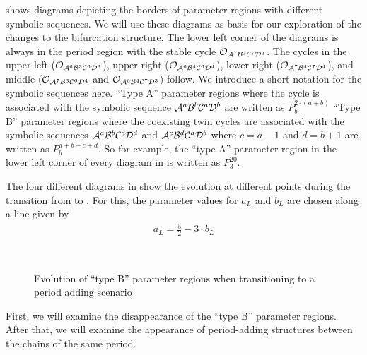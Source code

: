  shows diagrams depicting the borders of parameter regions with different symbolic sequences.
We will use these diagrams as basis for our exploration of the changes to the bifurcation structure.
The lower left corner of the diagrams is always in the period region with the stable cycle $\mathcal{O}_{\mathcal{A}^7\mathcal{B}^3\mathcal{C}^7\mathcal{D}^3}$.
The cycles in the upper left ($\mathcal{O}_{\mathcal{A}^6\mathcal{B}^3\mathcal{C}^6\mathcal{D}^3}$), upper right ($\mathcal{O}_{\mathcal{A}^6\mathcal{B}^4\mathcal{C}^6\mathcal{D}^4}$), lower right ($\mathcal{O}_{\mathcal{A}^7\mathcal{B}^4\mathcal{C}^7\mathcal{D}^4}$), and middle ($\mathcal{O}_{\mathcal{A}^7\mathcal{B}^3\mathcal{C}^6\mathcal{D}^4}$ and $\mathcal{O}_{\mathcal{A}^6\mathcal{B}^4\mathcal{C}^7\mathcal{D}^3}$) follow.
We introduce a short notation for the symbolic sequences here.
``Type A'' parameter regions where the cycle is associated with the symbolic sequence $\mathcal{A}^a\mathcal{B}^b\mathcal{C}^a\mathcal{D}^b$ are written as $P^{2 \cdot \left(a + b\right)}_b$
``Type B'' parameter regions where the coexisting twin cycles are associated with the symbolic sequences $\mathcal{A}^a\mathcal{B}^b\mathcal{C}^c\mathcal{D}^d$ and $\mathcal{A}^c\mathcal{B}^d\mathcal{C}^a\mathcal{D}^b$ where $c = a - 1$ and $d = b + 1$ are written as $P^{a + b + c + d}_b$.
So for example, the ``type A'' parameter region in the lower left corner of every diagram in  is written as $P^{20}_3$.

The four different diagrams in  show the evolution at different points during the transition from  to .
For this, the parameter values for $a_L$ and $b_L$ are chosen along a line given by 
\begin{align}
	a_L = \frac{5}{2} - 3 \cdot b_L
	\label{equ:add.change.paramline}
\end{align}

\begin{figure}
	\centering
	 \\
	\caption{Evolution of ``type B'' parameter regions when transitioning to a period adding scenario}
	\label{fig:add.change.regions}
\end{figure}

First, we will examine the disappearance of the ``type B'' parameter regions.
After that, we will examine the appearance of period-adding structures between the chains of the same period.



